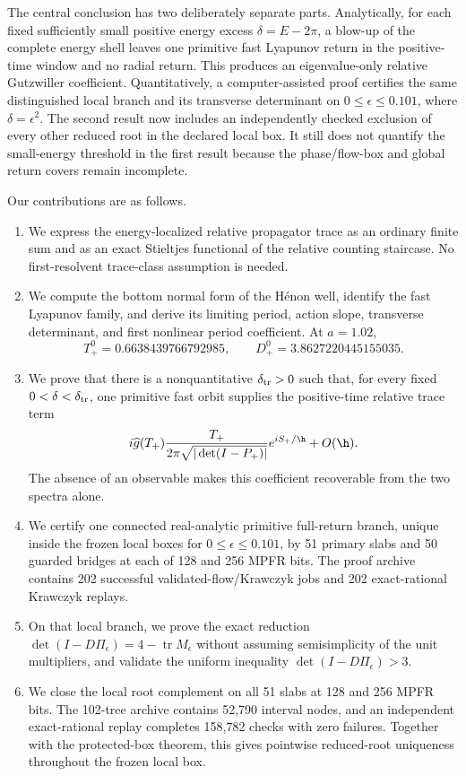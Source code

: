 The central conclusion has two deliberately separate parts.  Analytically,
for each fixed sufficiently small positive energy excess
\(\delta=E-2\pi\), a blow-up of the complete energy shell leaves one
primitive fast Lyapunov return in the positive-time window and no radial
return.  This produces an eigenvalue-only relative Gutzwiller coefficient.
Quantitatively, a computer-assisted proof certifies the same distinguished
local branch and its transverse determinant on
\(0\le\epsilon\le0.101\), where \(\delta=\epsilon^2\).  The second result
now includes an independently checked exclusion of every other reduced root
in the declared local box.  It still does not quantify the small-energy
threshold in the first result because the phase/flow-box and global return
covers remain incomplete.

Our contributions are as follows.
\begin{enumerate}[leftmargin=*,label=\textup{(\roman*)}]
 \item We express the energy-localized relative propagator trace as an
 ordinary finite sum and as an exact Stieltjes functional of the relative
 counting staircase.  No first-resolvent trace-class assumption is needed.
 \item We compute the bottom normal form of the H\'enon well, identify the
 fast Lyapunov family, and derive its limiting period, action slope,
 transverse determinant, and first nonlinear period coefficient.  At
 \(a=1.02\),
 \[
 T_+^0=0.6638439766792985,\qquad
 D_+^0=3.8627220445155035.
 \]
 \item We prove that there is a nonquantitative \(\delta_{\rm tr}>0\) such
 that, for every fixed \(0<\delta<\delta_{\rm tr}\), one primitive fast
 orbit supplies the positive-time relative trace term
 \[
 i\widehat g(T_+)\frac{T_+}{2\pi\sqrt{|\det(I-P_+)|}}
 e^{iS_+/\h}+O(\h).
 \]
 The absence of an observable makes this coefficient recoverable from the
 two spectra alone.
 \item We certify one connected real-analytic primitive full-return branch,
 unique inside the frozen local boxes for
 \(0\le\epsilon\le0.101\), by 51 primary slabs and 50 guarded bridges at
 each of 128 and 256 MPFR bits.  The proof archive contains 202 successful
 validated-flow/Krawczyk jobs and 202 exact-rational Krawczyk replays.
 \item On that local branch, we prove the exact reduction
 \(\det(I-D\Pi_\epsilon)=4-\operatorname{tr}M_\epsilon\) without assuming
 semisimplicity of the unit multipliers, and validate the uniform inequality
 \(\det(I-D\Pi_\epsilon)>3\).
 \item We close the local root complement on all 51 slabs at 128 and 256
 MPFR bits.  The 102-tree archive contains 52,790 interval nodes, and an
 independent exact-rational replay completes 158,782 checks with zero
 failures.  Together with the protected-box theorem, this gives pointwise
 reduced-root uniqueness throughout the frozen local box.
\end{enumerate}

